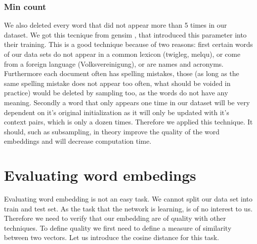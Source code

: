 \subsubsection{Min count}
We also deleted every word that did not appear more than 5 times in our dataset. We got this tecnique from gensim \cite{gensim}, that introduced this parameter into their training. This is a good technique because of two reasons: first certain words of our data sets do not appear in a common lexicon (twigleg, melqu), or come from a foreign language (Volksvereinigung), or are names and acronyms. Furthermore each document often has spelling mistakes, those (as long as the same spelling mistake does not appear too often, what should be voided in practice) would be deleted by sampling too, as the words do not have any meaning. Secondly a word that only appears one time in our dataset will be very dependent on it's original initialization as it will only be updated with it's context pairs, which is only a dozen times. Therefore we applied this technique. It should, such as subsampling, in theory improve the quality of the word embeddings and  will decrease computation time. 

\section{Evaluating word embedings}
Evaluating word embedding is not an easy task. We cannot split our data set into train and test set. As the task that the network is learning, is of no interest to us. Therefore we need to verify that our embedding are of quality with other techniques. To define quality we first need to define a measure of similarity between two vectors. Let us introduce the cosine distance for this task. 

